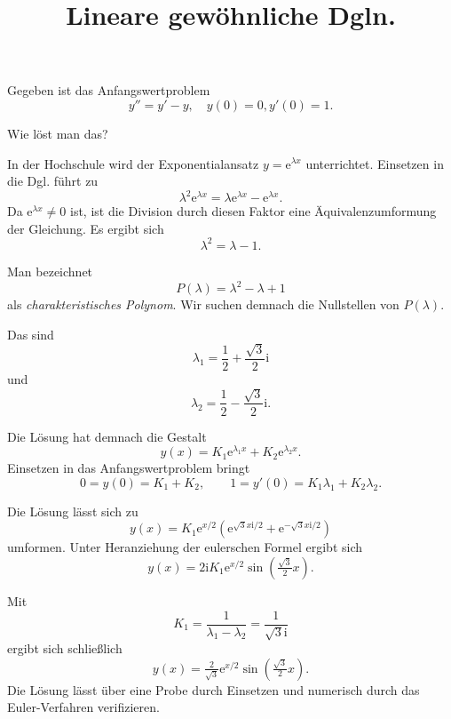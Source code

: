\documentclass{beamer}
\title{Lineare gewöhnliche Dgln.}
\date{}
\newcommand{\ee}{\mathrm e}
\newcommand{\ui}{\mathrm i}
\begin{document}
\maketitle

\begin{frame}
Gegeben ist das Anfangswertproblem
\[y'' = y'-y,\quad y(0)=0, y'(0)=1.\]
\end{frame}

\begin{frame}
Wie löst man das?
\end{frame}

\begin{frame}
In der Hochschule wird der Exponentialansatz $y=\ee^{\lambda x}$
unterrichtet. Einsetzen in die Dgl. führt zu
\[\lambda^2\ee^{\lambda x} = \lambda\ee^{\lambda x}-\ee^{\lambda x}.\]
Da $\ee^{\lambda x}\ne 0$ ist, ist die Division durch diesen Faktor
eine Äquivalenzumformung der Gleichung. Es ergibt sich
\[\lambda^2 = \lambda-1.\]
\end{frame}

\begin{frame}
Man bezeichnet
\[P(\lambda) = \lambda^2-\lambda+1\]
als \emph{charakteristisches Polynom}. Wir suchen demnach die
Nullstellen von $P(\lambda)$.
\end{frame}

\begin{frame}
Das sind
\[\lambda_1 = \frac{1}{2}+\frac{\sqrt{3}}{2}\ui\]
und
\[\lambda_2 = \frac{1}{2}-\frac{\sqrt{3}}{2}\ui.\]
\end{frame}

\begin{frame}
Die Lösung hat demnach die Gestalt
\[y(x) = K_1\ee^{\lambda_1 x}+K_2\ee^{\lambda_2 x}.\]
Einsetzen in das Anfangswertproblem bringt
\[0=y(0)=K_1+K_2,\qquad 1=y'(0)=K_1\lambda_1+K_2\lambda_2.\]
\end{frame}

\begin{frame}
Die Lösung lässt sich zu
\[y(x) = K_1\ee^{x/2}(\ee^{\sqrt{3}x\ui/2}+\ee^{-\sqrt{3}x\ui/2})\]
umformen. Unter Heranziehung der eulerschen Formel ergibt sich
\[y(x) = 2\ui K_1\ee^{x/2}\sin(\tfrac{\sqrt{3}}{2} x).\]
\end{frame}

\begin{frame}
Mit
\[K_1=\frac{1}{\lambda_1-\lambda_2} = \frac{1}{\sqrt{3}\ui}\]
ergibt sich schließlich
\[y(x) = \tfrac{2}{\sqrt{3}}\ee^{x/2}\sin(\tfrac{\sqrt{3}}{2} x).\]
Die Lösung lässt über eine Probe durch Einsetzen und numerisch
durch das Euler-Verfahren verifizieren.
\end{frame}
\end{document}
